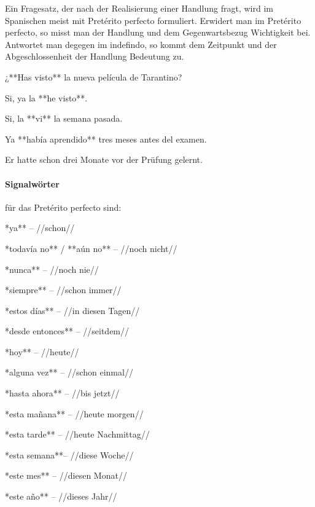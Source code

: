 Ein Fragesatz, der nach der Realisierung einer Handlung fragt, wird im Spanischen meist mit Pretérito perfecto
formuliert. Erwidert man im Pretérito perfecto, so misst man der Handlung und dem Gegenwartsbezug Wichtigkeit bei.
Antwortet man degegen im indefindo, so kommt dem Zeitpunkt und der Abgeschlossenheit der Handlung Bedeutung zu.

\begin{compactitem}
    \item ¿**Has visto** la nueva película de Tarantino?
    \begin{compactitem}
        \item Si, ya la **he visto**.
        \item Si, la **vi** la semana pasada.
    \end{compactitem}
\end{compactitem}

\begin{compactitem}
    \item Ya **había aprendido** tres meses antes del examen.
    \begin{compactitem}\itshape
      \item Er hatte schon drei Monate vor der Prüfung gelernt.
    \end{compactitem}
\end{compactitem}

\paragraph{Signalwörter} für das Pretérito perfecto sind:

\begin{multicols}{2}
\begin{compactitem}
    \item **ya** -- //schon//
    \item **todavía no** / **aún no** -- //noch nicht//
    \item **nunca** -- //noch nie//
    \item **siempre** -- //schon immer//
    \item **estos días**  -- //in diesen Tagen//
    \item **desde entonces** -- //seitdem//
    \item **hoy** -- //heute//
    \item **alguna vez** -- //schon einmal//
    \item **hasta ahora** -- //bis jetzt//
    \item **esta mañana** -- //heute morgen//
    \item **esta tarde** -- //heute Nachmittag//
    \item **esta semana**-- //diese Woche//
    \item **este mes** -- //diesen Monat//
    \item **este año** -- //dieses Jahr//
\end{compactitem}
\end{multicols}




